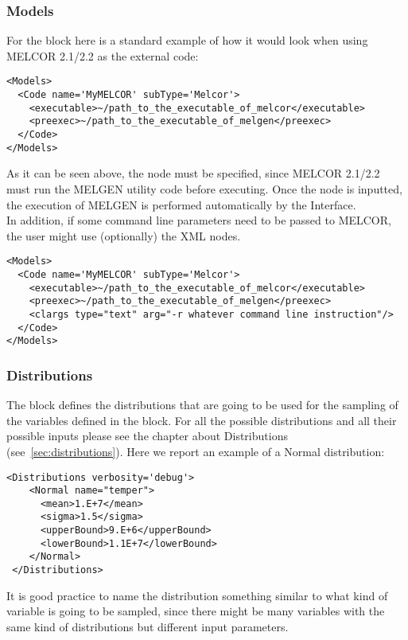 \subsubsection{Models}
For the  block here is a standard example of how it would look
when using MELCOR 2.1/2.2 as the external code:
\begin{lstlisting}[style=XML]
<Models>
  <Code name='MyMELCOR' subType='Melcor'>
    <executable>~/path_to_the_executable_of_melcor</executable>
    <preexec>~/path_to_the_executable_of_melgen</preexec>
  </Code>
</Models>
\end{lstlisting}
As it can be seen above, the  node must be specified, since MELCOR 2.1/2.2 must run the MELGEN utility
code before executing. Once the  node is inputted, the execution of MELGEN is performed automatically by the Interface.
\\In addition, if some command line parameters need to be passed to MELCOR, the user might use (optionally) the  XML nodes.
\begin{lstlisting}[style=XML]
<Models>
  <Code name='MyMELCOR' subType='Melcor'>
    <executable>~/path_to_the_executable_of_melcor</executable>
    <preexec>~/path_to_the_executable_of_melgen</preexec>
    <clargs type="text" arg="-r whatever command line instruction"/>
  </Code>
</Models>
\end{lstlisting}

\subsubsection{Distributions}
The  block defines the distributions that are going
to be used for the sampling of the variables defined in the 
block.
%
For all the possible distributions and all their possible inputs please see the
chapter about Distributions (see~\ref{sec:distributions}).
%
Here we report an example of a Normal distribution:
\begin{lstlisting}[style=XML,morekeywords={name,debug}]
<Distributions verbosity='debug'>
    <Normal name="temper">
      <mean>1.E+7</mean>
      <sigma>1.5</sigma>
      <upperBound>9.E+6</upperBound>
      <lowerBound>1.1E+7</lowerBound>
    </Normal>
 </Distributions>
\end{lstlisting}

It is good practice to name the distribution something similar to what kind of
variable is going to be sampled, since there might be many variables with the
same kind of distributions but different input parameters.
%
